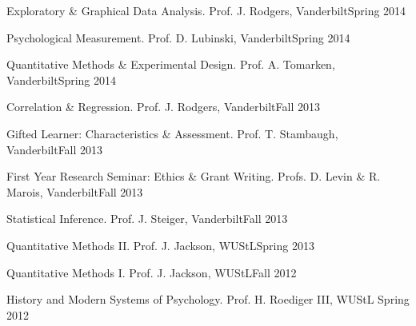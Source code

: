 \begin{etaremune}
\item Exploratory \& Graphical Data Analysis. Prof. J. Rodgers, Vanderbilt\hfill{Spring 2014}
\item Psychological Measurement. Prof. D. Lubinski, Vanderbilt\hfill{Spring 2014}
\item Quantitative Methods \& Experimental Design. Prof. A. Tomarken, Vanderbilt\hfill{Spring 2014}
\item Correlation \& Regression. Prof. J. Rodgers, Vanderbilt\hfill{Fall 2013}
\item Gifted Learner: Characteristics \& Assessment. Prof. T. Stambaugh, Vanderbilt\hfill{Fall 2013}
\item First Year Research Seminar: Ethics \& Grant Writing. Profs. D. Levin \& R. Marois, Vanderbilt\hfill{Fall 2013}
\item Statistical Inference. Prof. J. Steiger, Vanderbilt\hfill{Fall 2013}
\item Quantitative Methods \textrm{II}. Prof. J. Jackson, WUStL\hfill{Spring 2013}
\item Quantitative Methods \textrm{I}. Prof. J. Jackson, WUStL\hfill{Fall 2012}
\item History and Modern Systems of Psychology. Prof. H. Roediger \textrm{III}, WUStL \hfill{Spring 2012}\end{etaremune}
